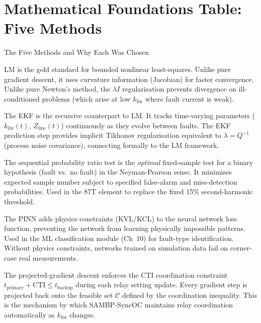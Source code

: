 \documentclass[12pt,a4paper]{article}
\newcommand{\kibr}{k_\mathrm{ibr}}
\begin{document}
\section{Mathematical Foundations Table: Five Methods}

\begin{archbox}{The Five Methods and Why Each Was Chosen}
\begin{description}[nosep,leftmargin=0pt]
  \item[\textbf{Levenberg--Marquardt (Parameter update):}]
    LM is the gold standard for bounded nonlinear least-squares.  Unlike pure
    gradient descent, it uses curvature information (Jacobian) for faster
    convergence.  Unlike pure Newton's method, the $\lambda I$ regularisation
    prevents divergence on ill-conditioned problems (which arise at low $\kibr$
    where fault current is weak).

  \item[\textbf{Extended Kalman Filter (State estimation):}]
    The EKF is the recursive counterpart to LM.  It tracks time-varying
    parameters ($\kibr(t)$, $Z_\mathrm{line}(t)$) continuously as they
    evolve between faults.  The EKF prediction step provides implicit
    Tikhonov regularisation equivalent to $\lambda = Q^{-1}$ (process
    noise covariance), connecting formally to the LM framework.

  \item[\textbf{Wald SPRT (Fault detection):}]
    The sequential probability ratio test is the \emph{optimal} fixed-sample
    test for a binary hypothesis (fault vs.\ no fault) in the Neyman-Pearson
    sense.  It minimises expected sample number subject to specified false-alarm
    and miss-detection probabilities.  Used in the 87T element to replace
    the fixed 15\% second-harmonic threshold.

  \item[\textbf{Physics-Informed NN (ML classification):}]
    The PINN adds physics constraints (KVL/KCL) to the neural network loss
    function, preventing the network from learning physically impossible patterns.
    Used in the ML classification module (Ch~10) for fault-type identification.
    Without physics constraints, networks trained on simulation data fail on
    corner-case real measurements.

  \item[\textbf{Projected gradient (Optimisation):}]
    The projected-gradient descent enforces the CTI coordination constraint
    $t_\mathrm{primary} + \mathrm{CTI} \leq t_\mathrm{backup}$ during each
    relay setting update.  Every gradient step is projected back onto the
    feasible set $\mathcal{C}$ defined by the coordination inequality.  This
    is the mechanism by which SAMBP-SyncOC maintains relay coordination
    automatically as $\kibr$ changes.
\end{description}
\end{archbox}
\end{document}
